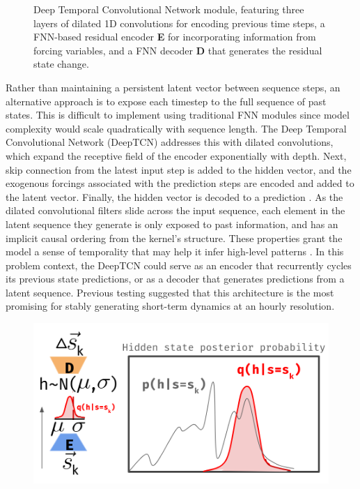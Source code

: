\documentclass[11pt]{article}
\begin{document}
\begin{multicols}{2}
\begin{figure}[H]
        \caption{Deep Temporal Convolutional Network module, featuring three layers of dilated 1D convolutions for encoding previous time steps, a FNN-based residual encoder \textbf{E} for incorporating information from forcing variables, and a FNN decoder \textbf{D} that generates the residual state change.}
        \label{deeptcn}
    \end{figure}

    Rather than maintaining a persistent latent vector between sequence steps, an alternative approach is to expose each timestep to the full sequence of past states. This is difficult to implement using traditional FNN modules since model complexity would scale quadratically with sequence length. The Deep Temporal Convolutional Network (DeepTCN) addresses this with dilated convolutions, which expand the receptive field of the encoder exponentially with depth. Next, skip connection from the latest input step is added to the hidden vector, and the exogenous forcings associated with the prediction steps are encoded and added to the latent vector. Finally, the hidden vector is decoded to a prediction \cite{chen_probabilistic_2020}. As the dilated convolutional filters slide across the input sequence, each element in the latent sequence they generate is only exposed to past information, and has an implicit causal ordering from the kernel's structure. These properties grant the model a sense of temporality that may help it infer high-level patterns \cite{oord_wavenet_2016}. In this problem context, the DeepTCN could serve as an encoder that recurrently cycles its previous state predictions, or as a decoder that generates predictions from a latent sequence. Previous testing suggested that this architecture is the most promising for stably generating short-term dynamics at an hourly resolution.

    \begin{figure}[H]
        \centering

        \includegraphics[width=.95\linewidth]{figs/ved.png}


\end{figure}
\end{multicols}
\end{document}
